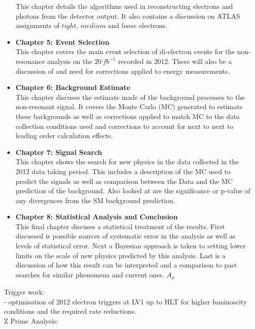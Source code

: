 \begin{itemize}
{This chapter details the algorithms used in reconstructing electrons and photons from the detector output. It also contains a discussion on ATLAS assignments of $tight$, $medium$ and $loose$ electrons.
}
\item{ 
{\bf Chapter 5: Event Selection} \\
This chapter covers the main event selection of di-electron events for the non-resonance analysis on the $20~fb^{-1}$ recorded in 2012. There will also be a discussion of and need for corrections applied to energy measurements.
}
\item{ 
{\bf Chapter 6: Background Estimate} \\
This chapter discuses the estimate made of the background processes to the non-resonant signal. It covers the Monte Carlo (MC) generated to estimate these backgrounds as well as corrections applied to match MC to the data collection conditions used and corrections to account for next to next to leading order calculation effects.
}
\item{ 
{\bf Chapter 7: Signal Search} \\
This chapter shows the search for new physics in the data collected in the 2012 data taking period. This includes a description of the MC used to predict the signals as well as comparison between the Data and the MC prediction of the background. Also looked at are the significance or p-value of any divergences from the SM background prediction.
}
\item{ 
{\bf Chapter 8: Statistical Analysis and Conclusion} \\
This final chapter discuses a statistical treatment of the results. First discussed is possible sources of systematic error in the analysis as well as levels of statistical error. Next a Bayesian approach is taken to setting lower limits on the scale of new physics predicted by this analysis. Last is a discussion of how this result can be interpreted and a comparison to past searches for similar phenomena and current ones. $A_{\mu}$
}
\end{itemize}




Trigger work:\\

- optimisation of 2012 electron triggers at LV1 up to HLT for higher luminoscity conditions and the required rate reductions.\\

Z Prime Analysis:\\

